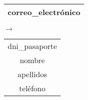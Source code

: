   \begin{center}
    \begin{minipage}{3.7cm}{\begin{tabular}{ | c | }
                  \hline
                  correo\_electrónico \\
                  \hline
                 \end{tabular} }
    \end{minipage}
    \begin{minipage}{0.7cm}{$\longrightarrow$}
    \end{minipage}
    \begin{minipage}{5.9cm}{\begin{tabular}{ | c | }
                  \hline
                  dni\_pasaporte \\
                  nombre \\
                  apellidos \\
                  teléfono \\
                  \hline
                 \end{tabular} }
    \end{minipage}
  \end{center}
